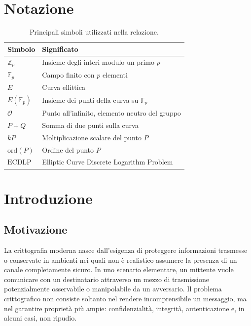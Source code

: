 \documentclass[12pt,a4paper,oneside]{report}
\newcommand{\OO}{\mathcal{O}}
\newcommand{\ECDLP}{\mathrm{ECDLP}}
\newcommand{\ord}{\mathrm{ord}}
\begin{document}
\tableofcontents
\listoffigures
\listoftables

\chapter*{Notazione}

\begin{table}[h]
\centering
\begin{tabular}{ll}
\toprule
\textbf{Simbolo} & \textbf{Significato} \\
\midrule
$\mathbb{Z}_p$ & Insieme degli interi modulo un primo $p$ \\
$\mathbb{F}_p$ & Campo finito con $p$ elementi \\
$E$ & Curva ellittica \\
$E(\mathbb{F}_p)$ & Insieme dei punti della curva su $\mathbb{F}_p$ \\
$\OO$ & Punto all'infinito, elemento neutro del gruppo \\
$P+Q$ & Somma di due punti sulla curva \\
$kP$ & Moltiplicazione scalare del punto $P$ \\
$\ord(P)$ & Ordine del punto $P$ \\
$\ECDLP$ & Elliptic Curve Discrete Logarithm Problem \\
\bottomrule
\end{tabular}
\caption{Principali simboli utilizzati nella relazione.}
\end{table}

\clearpage
{}

\chapter{Introduzione}

\section{Motivazione}

La crittografia moderna nasce dall'esigenza di proteggere informazioni trasmesse o conservate in ambienti nei quali non è realistico assumere la presenza di un canale completamente sicuro. In uno scenario elementare, un mittente vuole comunicare con un destinatario attraverso un mezzo di trasmissione potenzialmente osservabile o manipolabile da un avversario. Il problema crittografico non consiste soltanto nel rendere incomprensibile un messaggio, ma nel garantire proprietà più ampie: confidenzialità, integrità, autenticazione e, in alcuni casi, non ripudio.
\end{document}

